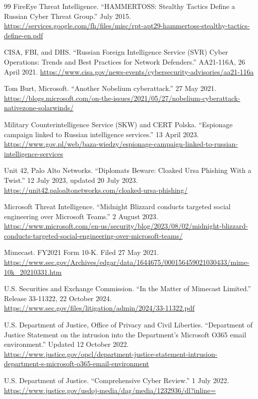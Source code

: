 \begin{thebibliography}{99}
 FireEye Threat Intelligence. ``HAMMERTOSS: Stealthy Tactics Define a Russian Cyber Threat Group.'' July 2015. \url{https://services.google.com/fh/files/misc/rpt-apt29-hammertoss-stealthy-tactics-define-en.pdf}

 CISA, FBI, and DHS. ``Russian Foreign Intelligence Service (SVR) Cyber Operations: Trends and Best Practices for Network Defenders.'' AA21-116A, 26 April 2021. \url{https://www.cisa.gov/news-events/cybersecurity-advisories/aa21-116a}

 Tom Burt, Microsoft. ``Another Nobelium cyberattack.'' 27 May 2021. \url{https://blogs.microsoft.com/on-the-issues/2021/05/27/nobelium-cyberattack-nativezone-solarwinds/}

 Military Counterintelligence Service (SKW) and CERT Polska. ``Espionage campaign linked to Russian intelligence services.'' 13 April 2023. \url{https://www.gov.pl/web/baza-wiedzy/espionage-campaign-linked-to-russian-intelligence-services}

 Unit 42, Palo Alto Networks. ``Diplomats Beware: Cloaked Ursa Phishing With a Twist.'' 12 July 2023, updated 20 July 2023. \url{https://unit42.paloaltonetworks.com/cloaked-ursa-phishing/}

 Microsoft Threat Intelligence. ``Midnight Blizzard conducts targeted social engineering over Microsoft Teams.'' 2 August 2023. \url{https://www.microsoft.com/en-us/security/blog/2023/08/02/midnight-blizzard-conducts-targeted-social-engineering-over-microsoft-teams/}

 Mimecast. FY2021 Form 10-K. Filed 27 May 2021. \url{https://www.sec.gov/Archives/edgar/data/1644675/000156459021030433/mime-10k_20210331.htm}

 U.S. Securities and Exchange Commission. ``In the Matter of Mimecast Limited.'' Release 33-11322, 22 October 2024. \url{https://www.sec.gov/files/litigation/admin/2024/33-11322.pdf}

 U.S. Department of Justice, Office of Privacy and Civil Liberties. ``Department of Justice Statement on the intrusion into the Department's Microsoft O365 email environment.'' Updated 12 October 2022. \url{https://www.justice.gov/opcl/department-justice-statement-intrusion-department-s-microsoft-o365-email-environment}

 U.S. Department of Justice. ``Comprehensive Cyber Review.'' 1 July 2022. \url{https://www.justice.gov/usdoj-media/dag/media/1232936/dl?inline=}


\end{thebibliography}
